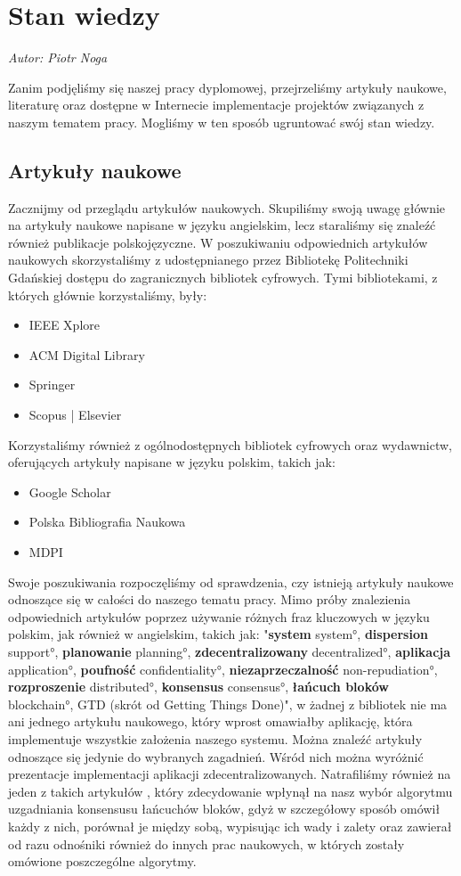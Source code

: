 \chapter{Stan wiedzy}
\label{chap:stan_wiedzy}
\textit{Autor: Piotr Noga}
\par Zanim podjęliśmy się naszej pracy dyplomowej, przejrzeliśmy artykuły naukowe, literaturę oraz dostępne w Internecie implementacje projektów związanych z naszym tematem pracy. Mogliśmy w ten sposób ugruntować swój stan wiedzy.
\section{Artykuły naukowe}
\label{sec:ArtykulyNaukowe}
Zacznijmy od przeglądu artykułów naukowych. Skupiliśmy swoją uwagę głównie na artykuły naukowe napisane w języku angielskim, lecz staraliśmy się znaleźć również publikacje polskojęzyczne. W poszukiwaniu odpowiednich artykułów naukowych skorzystaliśmy z udostępnianego przez Bibliotekę Politechniki Gdańskiej dostępu do zagranicznych bibliotek cyfrowych. Tymi bibliotekami, z których głównie korzystaliśmy, były:
\begin{itemize}
    \item IEEE Xplore
    \item ACM Digital Library
    \item Springer
    \item Scopus | Elsevier
\end{itemize}
Korzystaliśmy również z ogólnodostępnych bibliotek cyfrowych oraz wydawnictw, oferujących artykuły napisane w języku polskim, takich jak:
\begin{itemize}
    \item Google Scholar
    \item Polska Bibliografia Naukowa
    \item MDPI
\end{itemize}
Swoje poszukiwania rozpoczęliśmy od sprawdzenia, czy istnieją artykuły naukowe odnoszące się w całości do naszego tematu pracy. Mimo próby znalezienia odpowiednich artykułów  poprzez używanie różnych fraz kluczowych w języku polskim, jak również w angielskim, takich jak: "\textbf{system} \ang{system}, \textbf{dispersion} \ang{support}, \textbf{planowanie} \ang{planning}, \textbf{zdecentralizowany} \ang{decentralized}, \textbf{aplikacja} \ang{application}, \textbf{poufność} \ang{confidentiality}, \textbf{niezaprzeczalność} \ang{non-repudiation}, \textbf{rozproszenie} \ang{distributed}, \textbf{konsensus} \ang{consensus}, \textbf{łańcuch bloków} \ang{blockchain}, GTD (skrót od Getting Things Done)", w żadnej z bibliotek nie ma ani jednego artykułu naukowego, który wprost omawiałby aplikację, która implementuje wszystkie założenia naszego systemu. Można znaleźć artykuły odnoszące się jedynie do wybranych zagadnień. Wśród nich można wyróżnić prezentacje implementacji aplikacji zdecentralizowanych. Natrafiliśmy również na jeden z takich artykułów \cite{EvolutionOfBlockchainCon}, który zdecydowanie wpłynął na nasz wybór algorytmu uzgadniania konsensusu łańcuchów bloków, gdyż w szczegółowy sposób omówił każdy z nich, porównał je między sobą, wypisując ich wady i zalety oraz zawierał od razu odnośniki również do innych prac naukowych, w których zostały omówione poszczególne algorytmy.


